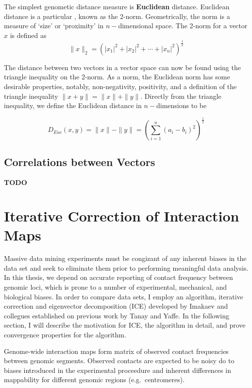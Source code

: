 \documentclass[phd,tocprelim]{cornell}
\begin{document}
The simplest genometic distance measure is \textbf{Euclidean} distance.  Euclidean distance is a particular , known as
the 2-norm.  Geometrically, the norm is a measure of `size' or `proximity' in $n-$dimensional space.  The 2-norm for a vector $x$ is
defined as
\[
  \|x\|_{2} = {(|x_1|^2 + |x_2|^2 + \cdots + |x_n|^2)}^{\frac{1}{2}}
\]

The distance between two vectors in a vector space can now be found using the triangle inequality on the 2-norm.  As a norm, the Euclidean
norm has some desirable properties, notably, non-negativity, positivity, and a definition of the triangle inequality
$\|x + y\| = \|x\| + \|y\|$\cite{horn2013}.  Directly from the triangle inequality, we define the Euclidean distance
in $n-$dimensions to be

\[
  D_{Euc}(x,y) = \|x\| - \|y\| = {(\sum_{i=1}^{n}{(a_i - b_i)}^2)}^{\frac{1}{2}}
\]

\subsection{Correlations between Vectors}

\textbf{TODO}

\section{Iterative Correction of Interaction Maps}

Massive data mining experiments must be congizant of any inherent biases in the data set and seek to eliminate them prior to performing
meaningful data analysis.  In this thesis, we depend on accurate reporting of contact frequency between genomic loci, which is prone
to a number of experimental, mechanical, and biological biases\cite{dekker2006}.  In order to compare data sets, I employ an algorithm,
iterative correction and eigenvector decomposition (ICE) developed by Imakaev and collegues\cite{imakaev2012} established on previous
work by Tanay and Yaffe\cite{yaffe2011}.  In the following section, I will describe the motivation for ICE, the algorithm in detail, and
prove convergence properties for the algorithm.

Genome-wide interaction maps form matrix of observed contact frequencies between genomic segments.  Observed contacts are expected to
be noisy do to biases introduced in the experimental proceedure and inherent differences in mappability for different genomic regions
(e.g.\ centromeres).
\end{document}
